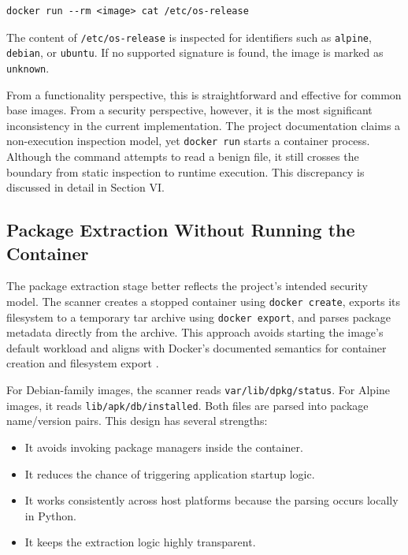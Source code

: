 \documentclass[12pt,draftclsnofoot,onecolumn]{IEEEtran}
\begin{document}
\begin{lstlisting}[style=docksec,caption={Current operating system detection approach in DockSec.},label={lst:osdetect}]
docker run --rm <image> cat /etc/os-release
\end{lstlisting}

The content of \texttt{/etc/os-release} is inspected for identifiers such as \texttt{alpine}, \texttt{debian}, or \texttt{ubuntu}. If no supported signature is found, the image is marked as \texttt{unknown}.

From a functionality perspective, this is straightforward and effective for common base images. From a security perspective, however, it is the most significant inconsistency in the current implementation. The project documentation claims a non-execution inspection model, yet \texttt{docker run} starts a container process. Although the command attempts to read a benign file, it still crosses the boundary from static inspection to runtime execution. This discrepancy is discussed in detail in Section VI.

\subsection{Package Extraction Without Running the Container}
The package extraction stage better reflects the project's intended security model. The scanner creates a stopped container using \texttt{docker create}, exports its filesystem to a temporary tar archive using \texttt{docker export}, and parses package metadata directly from the archive. This approach avoids starting the image's default workload and aligns with Docker's documented semantics for container creation and filesystem export \cite{dockercreate,dockerexport}.

For Debian-family images, the scanner reads \texttt{var/lib/dpkg/status}. For Alpine images, it reads \texttt{lib/apk/db/installed}. Both files are parsed into package name/version pairs. This design has several strengths:
\begin{itemize}
  \item It avoids invoking package managers inside the container.
  \item It reduces the chance of triggering application startup logic.
  \item It works consistently across host platforms because the parsing occurs locally in Python.
  \item It keeps the extraction logic highly transparent.
\end{itemize}
\end{document}
